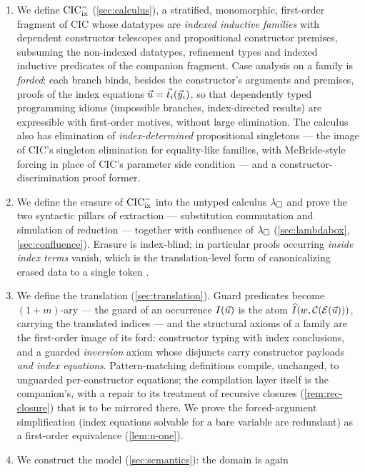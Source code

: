 \begin{enumerate}[leftmargin=2em]
\item We define $\mathrm{CIC}^{-}_{\mathrm{ix}}$ (\cref{sec:calculus}), a stratified, monomorphic,
  first-order fragment of CIC whose datatypes are \emph{indexed inductive
  families} with dependent constructor telescopes and propositional
  constructor premises, subsuming the non-indexed datatypes, refinement
  types and indexed inductive predicates of the companion fragment.  Case
  analysis on a family is \emph{forded}: each branch binds, besides the
  constructor's arguments and premises, proofs of the index equations
  $\vec{u} = \vec{t}_i(\vec{y}_i)$, so that dependently typed programming
  idioms (impossible branches, index-directed results) are expressible
  with first-order motives, without large elimination.  The calculus also
  has elimination of \emph{index-determined} propositional singletons ---
  the image of CIC's singleton elimination for equality-like families,
  with McBride-style forcing in place of CIC's parameter side condition
  --- and a constructor-discrimination proof former.
\item We define the erasure of $\mathrm{CIC}^{-}_{\mathrm{ix}}$ into the untyped calculus $\lambda_{\square}$
  and prove the two syntactic pillars of extraction --- substitution
  commutation and simulation of reduction --- together with confluence of
  $\lambda_{\square}$ (\cref{sec:lambdabox}, \cref{sec:confluence}).  Erasure is
  index-blind; in particular proofs occurring \emph{inside index terms}
  vanish, which is the translation-level form of canonicalizing erased
  data to a single token \cite{Atkey2018,Werner2008}.
\item We define the translation (\cref{sec:translation}).  Guard
  predicates become $(1{+}m)$-ary --- the guard of an occurrence
  $I(\vec{u})$ is the atom $\widehat{I}(w, \mathcal{C}(\mathcal{E}(\vec{u})))$, carrying
  the translated indices --- and the structural axioms of a family are the
  first-order image of its ford: constructor typing with index conclusions,
  and a guarded \emph{inversion} axiom whose disjuncts carry constructor
  payloads \emph{and index equations}.  Pattern-matching definitions
  compile, unchanged, to unguarded per-constructor equations; the
  compilation layer itself is the companion's, with a repair to its
  treatment of recursive closures (\cref{rem:rec-closure}) that is to
  be mirrored there.  We prove
  the forced-argument simplification (index equations solvable for a bare
  variable are redundant) as a first-order equivalence
  (\cref{lem:n-one}).
\item We construct the model (\cref{sec:semantics}): the domain is again

\end{enumerate}
